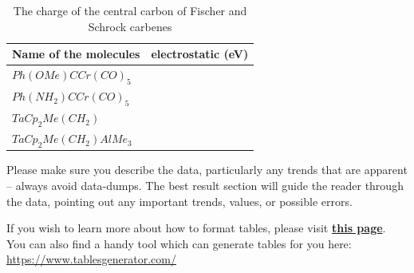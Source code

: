 \documentclass[twocolumn]{article} %
\begin{document}
\begin{table}[h]
\caption{The charge of the central carbon of Fischer and Schrock carbenes}
\begin{tabular}{L{1.5in}C{1.5in}}\toprule
Name of the molecules  & electrostatic (eV)    \\ \hline
 $Ph(OMe)CCr(CO)_5$    &  \\
$Ph(NH_2)CCr(CO)_5$     &  \\
$TaCp_2Me(CH_2)$     &  \\
$TaCp_2Me(CH_2)AlMe_3$ & \\\bottomrule
\end{tabular}
\end{table}






Please make sure you describe the data, particularly any trends that are apparent -- always avoid data-dumps. The best result section will guide the reader through the data, pointing out any important trends, values, or possible errors.

\bigskip %

If you wish to learn more about how to format tables, please visit \href{https://es.overleaf.com/learn/latex/Tables}{\textbf{this page}}.
You can also find a handy tool which can generate tables for you here: \url{https://www.tablesgenerator.com/}
\end{document}
